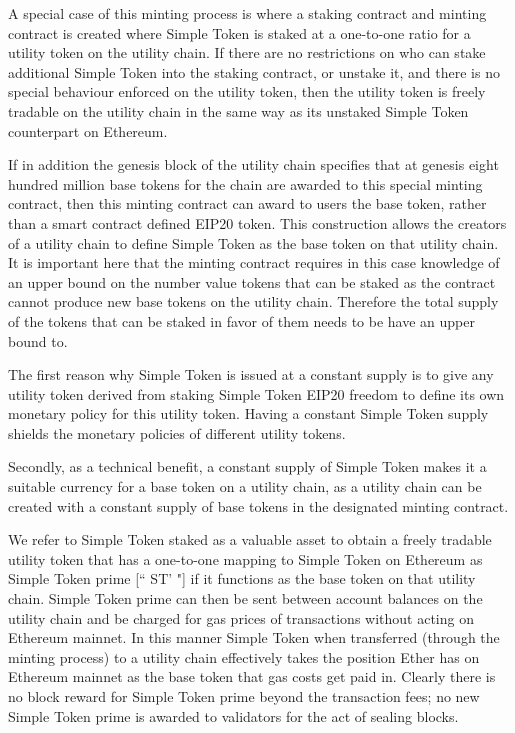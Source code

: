 \documentclass[12pt,a4paper, twocolumn]{article}
\begin{document}
A special case of this minting process is where a staking contract and minting contract is created where Simple Token is staked at a one-to-one ratio for a utility token on the utility chain.  If there are no restrictions on who can stake additional Simple Token into the staking contract, or unstake it, and there is no special behaviour enforced on the utility token, then the utility token is freely tradable on the utility chain in the same way as its unstaked Simple Token counterpart on Ethereum. \par
If in addition the genesis block of the utility chain specifies that at genesis eight hundred million base tokens for the chain are awarded to this special minting contract, then this minting contract can award to users the base token, rather than a smart contract defined EIP20 token.  This construction allows the creators of a utility chain to define Simple Token as the base token on that utility chain.  It is important here that the minting contract requires in this case knowledge of an upper bound on the number value tokens that can be staked as the contract cannot produce new base tokens on the utility chain.  Therefore the total supply of the tokens that can be staked in favor of them needs to be have an upper bound to. \par
The first reason why Simple Token is issued at a constant supply is to give any utility token derived from staking Simple Token EIP20 freedom to define its own monetary policy for this utility token. Having a constant Simple Token supply shields the monetary policies of different utility tokens. \par
Secondly, as a technical benefit, a constant supply of Simple Token makes it a suitable currency for a base token on a utility chain, as a utility chain can be created with a constant supply of base tokens in the designated minting contract. \par
We refer to Simple Token staked as a valuable asset to obtain a freely tradable utility token that has a one-to-one mapping to Simple Token on Ethereum as Simple Token prime [“ ST’ "] if it functions as the base token on that utility chain. Simple Token prime can then be sent between account balances on the utility chain and be charged for gas prices of transactions without acting on Ethereum mainnet.  In this manner Simple Token when transferred (through the minting process) to a utility chain effectively takes the position Ether has on Ethereum mainnet as the base token that gas costs get paid in.  Clearly there is no block reward for Simple Token prime beyond the transaction fees; no new Simple Token prime is awarded to validators for the act of sealing blocks. \par
\end{document}
